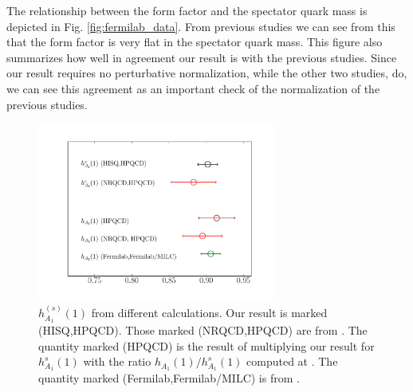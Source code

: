 The relationship between the form factor and the spectator quark mass is depicted in Fig. \ref{fig:fermilab_data}. From previous studies we can see from this that the form factor is very flat in the spectator quark mass. This figure also summarizes how well in agreement our result is with the previous studies. Since our result requires no perturbative normalization, while the other two studies, do, we can see this agreement as an important check of the normalization of the previous studies.

\begin{figure}[htb!]
  \begin{center}
  \hspace{-20pt}
  \includegraphics[width=0.7\textwidth]{images/BsDsstar/comparisons.pdf}
  \caption{ $h_{A_1}^{(s)}(1)$ from different calculations. Our result is marked (HISQ,HPQCD). Those marked (NRQCD,HPQCD) are from \cite{Harrison:2017fmw}. The quantity marked (HPQCD) is the result of multiplying our result for $h^s_{A_1}(1)$ with the ratio $h_{A_1}(1)/h^s_{A_1}(1)$ computed at \cite{Harrison:2017fmw}. The quantity marked (Fermilab,Fermilab/MILC) is from \cite{Bailey:2014tva}. \label{fig:comparison_BsDsstar}}
  \end{center}
\end{figure}

